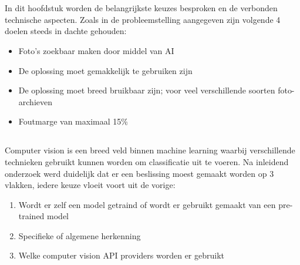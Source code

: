 
\chapter{}
\label{ch:methodologie}

\section{}
\label{sec:methodologie-inleiding}

In dit hoofdstuk worden de belangrijkste keuzes besproken en de verbonden technische aspecten. Zoals in de probleemstelling aangegeven zijn volgende 4 doelen steeds in dachte gehouden:
\begin{itemize}
    \item Foto's zoekbaar maken door middel van AI
    \item De oplossing moet gemakkelijk te gebruiken zijn
    \item De oplossing moet breed bruikbaar zijn; voor veel verschillende soorten foto-archieven
    \item Foutmarge van maximaal 15\%
\end{itemize}

\section{}
\label{sec:keuze-van-computer-vision}
Computer vision is een breed veld binnen machine learning waarbij verschillende technieken gebruikt kunnen worden om classificatie uit te voeren. Na inleidend onderzoek werd duidelijk dat er een beslissing moest gemaakt worden op 3 vlakken, iedere keuze vloeit voort uit de vorige:
\begin{enumerate}
    \item Wordt er zelf een model getraind of wordt er gebruikt gemaakt van een pre-trained model
    \item Specifieke of algemene herkenning
    \item Welke computer vision API providers worden er gebruikt
\end{enumerate}

